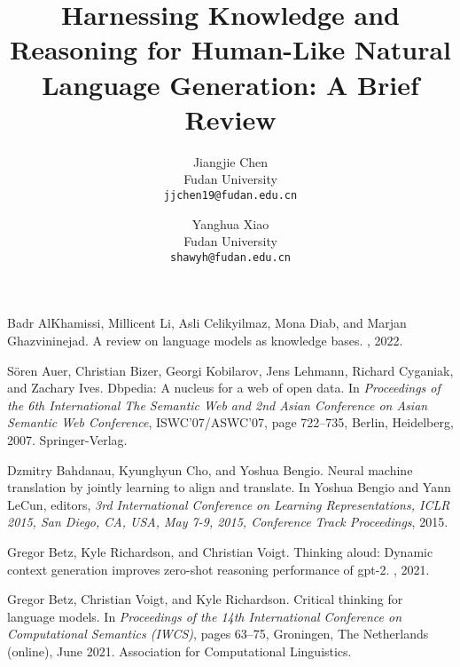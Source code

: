 \documentclass[11pt]{article}
\title{Harnessing Knowledge and Reasoning for Human-Like Natural Language Generation: A Brief Review}
\begin{document}


\author{
Jiangjie Chen \\
Fudan University\\
\texttt{jjchen19@fudan.edu.cn}
\and
Yanghua Xiao \\
Fudan University\\
\texttt{shawyh@fudan.edu.cn}
}



\maketitle



%
%

\begin{thebibliography}{100}

Badr AlKhamissi, Millicent Li, Asli Celikyilmaz, Mona Diab, and Marjan
  Ghazvininejad.
\newblock A review on language models as knowledge bases.
, 2022.

S\"{o}ren Auer, Christian Bizer, Georgi Kobilarov, Jens Lehmann, Richard
  Cyganiak, and Zachary Ives.
\newblock Dbpedia: A nucleus for a web of open data.
\newblock In {\em Proceedings of the 6th International The Semantic Web and 2nd
  Asian Conference on Asian Semantic Web Conference}, ISWC'07/ASWC'07, page
  722–735, Berlin, Heidelberg, 2007. Springer-Verlag.

Dzmitry Bahdanau, Kyunghyun Cho, and Yoshua Bengio.
\newblock Neural machine translation by jointly learning to align and
  translate.
\newblock In Yoshua Bengio and Yann LeCun, editors, {\em 3rd International
  Conference on Learning Representations, {ICLR} 2015, San Diego, CA, USA, May
  7-9, 2015, Conference Track Proceedings}, 2015.

Gregor Betz, Kyle Richardson, and Christian Voigt.
\newblock Thinking aloud: Dynamic context generation improves zero-shot
  reasoning performance of gpt-2.
, 2021.

Gregor Betz, Christian Voigt, and Kyle Richardson.
\newblock Critical thinking for language models.
\newblock In {\em Proceedings of the 14th International Conference on
  Computational Semantics (IWCS)}, pages 63--75, Groningen, The Netherlands
  (online), June 2021. Association for Computational Linguistics.


\end{thebibliography}
\end{document}

